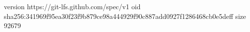 version https://git-lfs.github.com/spec/v1
oid sha256:341969f95ea30f23f9b879ce98a444929f90c887add0927f1286468cb0e5deff
size 92679
